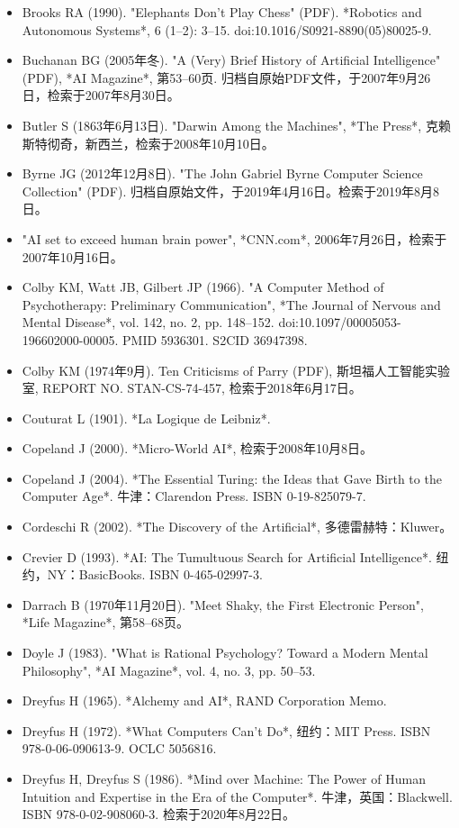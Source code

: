 \begin{itemize}
\item Brooks RA (1990). "Elephants Don't Play Chess" (PDF). *Robotics and Autonomous Systems*, 6 (1–2): 3–15. doi:10.1016/S0921-8890(05)80025-9.  
\item Buchanan BG (2005年冬). "A (Very) Brief History of Artificial Intelligence" (PDF), *AI Magazine*, 第53–60页. 归档自原始PDF文件，于2007年9月26日，检索于2007年8月30日。  
\item Butler S (1863年6月13日). "Darwin Among the Machines", *The Press*, 克赖斯特彻奇，新西兰，检索于2008年10月10日。  
\item Byrne JG (2012年12月8日). "The John Gabriel Byrne Computer Science Collection" (PDF). 归档自原始文件，于2019年4月16日。检索于2019年8月8日。  
\item "AI set to exceed human brain power", *CNN.com*, 2006年7月26日，检索于2007年10月16日。  
\item Colby KM, Watt JB, Gilbert JP (1966). "A Computer Method of Psychotherapy: Preliminary Communication", *The Journal of Nervous and Mental Disease*, vol. 142, no. 2, pp. 148–152. doi:10.1097/00005053-196602000-00005. PMID 5936301. S2CID 36947398.  
\item Colby KM (1974年9月). Ten Criticisms of Parry (PDF), 斯坦福人工智能实验室, REPORT NO. STAN-CS-74-457, 检索于2018年6月17日。  
\item Couturat L (1901). *La Logique de Leibniz*.  
\item Copeland J (2000). *Micro-World AI*, 检索于2008年10月8日。  
\item Copeland J (2004). *The Essential Turing: the Ideas that Gave Birth to the Computer Age*. 牛津：Clarendon Press. ISBN 0-19-825079-7.  
\item Cordeschi R (2002). *The Discovery of the Artificial*, 多德雷赫特：Kluwer。  
\item Crevier D (1993). *AI: The Tumultuous Search for Artificial Intelligence*. 纽约，NY：BasicBooks. ISBN 0-465-02997-3.  
\item Darrach B (1970年11月20日). "Meet Shaky, the First Electronic Person", *Life Magazine*, 第58–68页。  
\item Doyle J (1983). "What is Rational Psychology? Toward a Modern Mental Philosophy", *AI Magazine*, vol. 4, no. 3, pp. 50–53.  
\item Dreyfus H (1965). *Alchemy and AI*, RAND Corporation Memo.  
\item Dreyfus H (1972). *What Computers Can't Do*, 纽约：MIT Press. ISBN 978-0-06-090613-9. OCLC 5056816.  
\item Dreyfus H, Dreyfus S (1986). *Mind over Machine: The Power of Human Intuition and Expertise in the Era of the Computer*. 牛津，英国：Blackwell. ISBN 978-0-02-908060-3. 检索于2020年8月22日。  

\end{itemize}
